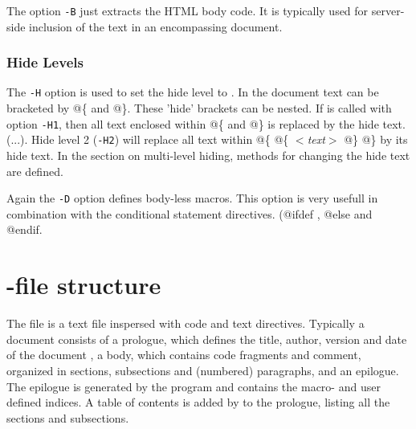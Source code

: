 The option {\tt -B} just extracts the HTML body code.
It is typically used for server-side inclusion of the text in an encompassing
document.

\subsubsection{Hide Levels}
The {\tt -H\n} option is used to set the hide level to \n. In the \Mx
document text can be bracketed by @\{ and @\}. These 'hide'
brackets can be nested. If \Mx is called with option {\tt -H1}, then
all text enclosed within @\{ and @\} is replaced by the hide text.
(...). Hide level 2 ({\tt -H2}) will replace all text within 
@\{ @\{ {\it $<$text$>$} @\} @\} by its hide text. 
In the section on multi-level hiding, methods for changing the hide
text are defined.

Again the {\tt -D\macro} option defines body-less macros.
This option is very usefull in combination with the conditional
statement directives. (@ifdef \macro, @else and @endif.

\section{\Mx-file structure}
The \Mx file is a text file inspersed with code and text directives.
Typically a \Mx document consists of a prologue, which defines the
title, author, version and date of the document , a body, which
contains code fragments and comment, organized in sections,
subsections and (numbered) paragraphs, and an epilogue. The epilogue
is generated by the \Mx program and contains the macro- and user
defined indices. A table of contents is added by \Mx to the prologue,
listing all the sections and subsections.

